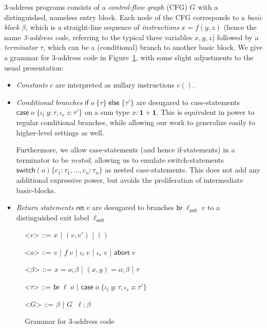 \documentclass[acmsmall,screen,review]{acmart}
\newcommand{\mb}[1]{\ensuremath{\mathbf{#1}}}
\newcommand{\ms}[1]{\ensuremath{\mathsf{#1}}}
\newcommand{\lto}{:}
\newcommand{\linl}[1]{\iota_l\;{#1}}
\newcommand{\linr}[1]{\iota_r\;{#1}}
\newcommand{\labort}[1]{\ms{abort}\;{#1}}
\newcommand{\brb}[2]{\ms{br}\;#1\;#2}
\newcommand{\ite}[3]{\ms{if}\;#1\;\{#2\}\;\ms{else}\;\{#3\}}
\newcommand{\casestmt}[5]{\ms{case}\;#1\;\{\linl{#2} \lto #3, \linr{#4} \lto #5\}}
\begin{document}
3-address programs consists of a \emph{control-flow graph} (CFG) $G$ with a distinguished, nameless
entry block. Each node of the CFG corresponds to a \emph{basic block} $\beta$, which is a
straight-line sequence of \emph{instructions} $x = f(y, z)$ (hence the name \emph{3-address code},
referring to the typical three variables $x, y, z$) followed by a \emph{terminator} $\tau$, which
can be a (conditional) branch to another basic block. We give a grammar for 3-address code in
Figure~\ref{fig:3addr-grammar}, with some slight adjustments to the usual presentation:
\begin{itemize}
  \item \emph{Constants} $c$ are interpreted as nullary instructions $c()$.
  \item \emph{Conditional branches} $\ite{o}{\tau}{\tau'}$ are desugared to case-statements
  $\casestmt{o}{y}{\tau}{z}{\tau'}$ on a sum type $x : \mb{1} + \mb{1}$. This is equivalent in power
  to regular conditional branches, while allowing our work to generalize easily to higher-level
  settings as well.

  Furthermore, we allow case-statements (and hence if-statements) in a terminator to be
  \emph{nested}, allowing us to emulate switch-statements $\ms{switch}(o) \{c_1 : \tau_1 ,
  ... , c_n : \tau_n\}$ as nested case-statements. This does not add any additional
  expressive power, but avoids the proliferation of intermediate basic-blocks.

  \item \emph{Return statements} $\ms{ret}\;v$ are desugared to branches $\brb{\ell_{\ms{exit}}}{v}$
  to a distinguished exit label $\ell_{\ms{exit}}$
\end{itemize}

\begin{figure}[H]
  \begin{center}
    \begin{grammar}
      <\(v\)> ::= \(x\) \;|\; \((v, v')\) \;|\; \(()\)

      <\(o\)> ::= \(v\) \;|\; \(f\;v\) \;|\; \(\linl{v}\) \;|\; \(\linr{v}\) \;|\; \(\labort{v}\)

      <\(\beta\)> ::=
      \(x = o ; \beta\)
      \;|\; \((x, y) = o ; \beta\)
      \;|\; \(\tau\)

      <\(\tau\)> ::= \(\brb{\ell}{o}\) \;|\; $\casestmt{o}{y}{\tau}{z}{\tau'}$
      
      <\(G\)> ::= \(\beta\) \;|\; \(G \;\; \ell : \beta\)
    \end{grammar}
  \end{center}
  \caption{Grammar for 3-address code}
  \Description{}
  \label{fig:3addr-grammar}
\end{figure}
\end{document}
